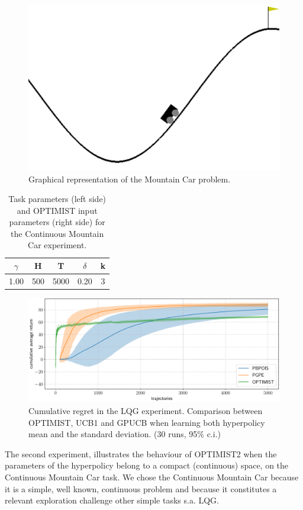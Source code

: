 \begin{figure}[t!] 
\centering
\includegraphics[width=.6\textwidth,keepaspectratio]{Images/MC.png}
\caption{Graphical representation of the Mountain Car problem.} 
\label{fig:MC}
\end{figure} 

\begin{table}[t!]
\centering
\begin{tabular}{ccc|cc} 
\toprule
$\gamma$ & H & T & $\delta$ & k\\ 
\midrule
1.00 & 500 & 5000 & 0.20 & 3\\
\bottomrule
\end{tabular}
\caption{Task parameters (left side) and \gls{OPTIMIST} input parameters (right side) for the Continuous Mountain Car experiment.}
\label{tab:MCcoeff}
\end{table}

\begin{figure}[t!] 
\centering
\includegraphics[width=\textwidth,height=\textheight,keepaspectratio]{Images/MC_mu.pdf}
\caption{Cumulative regret in
the \gls{LQG} experiment. Comparison between
\gls{OPTIMIST}, \gls{UCB}1 and \gls{GPUCB} when learning both hyperpolicy mean and the standard deviation.
(30 runs, 95\% c.i.)} 
\label{fig:MCcomparison} 
\end{figure}

The second experiment, illustrates the behaviour of \gls{OPTIMIST}2  
when the parameters of the hyperpolicy belong to a compact (continuous) space, on the Continuous Mountain Car task\cite{brockman2016openai}. We chose the Continuous Mountain Car because it is a simple, well known, continuous problem and because it constitutes a relevant exploration challenge \wrt other simple tasks s.a. \gls{LQG}. 

